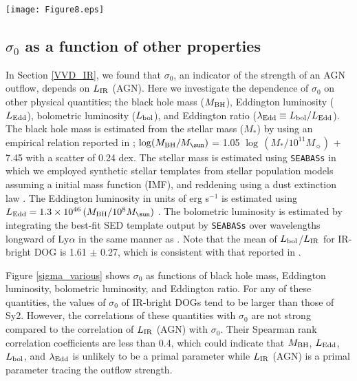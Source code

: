 \documentclass[twocolumn]{aastex6}
\begin{document}
   \begin{figure*}
   \centering
   \texttt{[image: Figure8.eps]}
   \caption{$\sigma_0$ as functions of (a) black hole mass, (b) Eddington luminosity, (c) bolometric luminosity, and (d) Eddington ratio. Symbols are the same as those in Figure \ref{sigma}.}
   \label{sigma_various}
   \end{figure*}

\subsection{$\sigma_0$ as a function of other properties}
In Section \ref{VVD_IR}, we found that $\sigma_0$, an indicator of the strength of an AGN outflow, depends on $L_{\rm IR}$ (AGN).
Here we investigate the dependence of $\sigma_0$ on other physical quantities; the black hole mass ($M_{\rm BH}$), Eddington luminosity ($L_{\rm Edd}$), bolometric luminosity ($L_{\rm bol}$), and Eddington ratio ($\lambda_{\rm Edd} \equiv L_{\rm bol}/L_{\rm Edd}$).
The black hole mass is estimated from the stellar mass ($M_*$) by using an empirical relation reported in \cite{Reines}; $\log (M_{\rm BH}/M_{\sun})$ = 1.05 $\log \,(M_*/10^{11} M_{\sun})$ + 7.45 with a scatter of 0.24 dex.
The stellar mass is estimated using {\tt SEABASs} in which we employed synthetic stellar templates from \cite{Bruzual} stellar population models assuming a \cite{Chabrier} initial mass function (IMF), and  reddening using a \cite{Calzetti} dust extinction law \citep[see also][]{Toba_17b}.
The Eddington luminosity in units of erg s$^{-1}$ is estimated using $L_{\rm Edd} = 1.3 \times 10^{46} \,(M_{\rm BH}/10^8 M_{\sun})$ \citep{Ferrarese}.
The bolometric luminosity is estimated by integrating the best-fit SED template output by {\tt SEABASs} over wavelengths longward of Ly$\alpha$ in the same manner as \cite{Assef}.
Note that the mean of $L_{\rm bol}$/$L_{\rm IR}$ for IR-bright DOG is 1.61 $\pm$ 0.27, which is consistent with that reported in \cite{Fan}.

Figure \ref{sigma_various} shows $\sigma_0$ as functions of black hole mass, Eddington luminosity, bolometric luminosity, and Eddington ratio.
For any of these quantities, the values of $\sigma_0$ of IR-bright DOGs tend to be larger than those of Sy2.
However, the correlations of these quantities with $\sigma_0$ are not strong compared to the correlation of $L_{\rm IR}$ (AGN) with $\sigma_0$.
Their Spearman rank correlation coefficients are less than 0.4, which could indicate that $M_{\rm BH}$, $L_{\rm Edd}$, $L_{\rm bol}$, and $\lambda_{\rm Edd}$ is unlikely to be a primal parameter while $L_{\rm IR}$ (AGN) is a primal parameter tracing the outflow strength.
\end{document}
